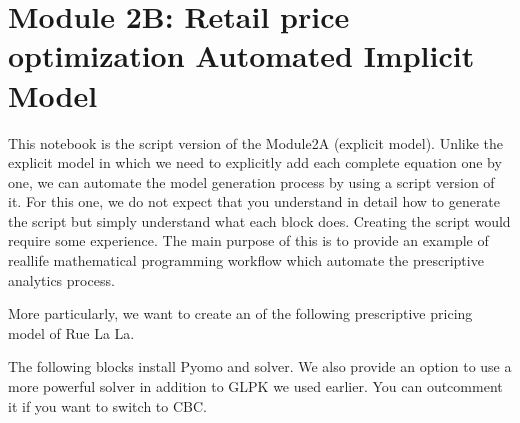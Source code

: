 \documentclass[letterpaper,10pt,english]{jupyterBook}
\begin{document}
\section{Module 2B: Retail price optimization \sphinxhyphen{} Automated Implicit Model}
\label{\detokenize{docs/Case1_5_Module2B_Retail_Price_Optimization_Script:module-2b-retail-price-optimization-automated-implicit-model}}\label{\detokenize{docs/Case1_5_Module2B_Retail_Price_Optimization_Script::doc}}
\sphinxAtStartPar
{}

\sphinxAtStartPar
This notebook is the script version of the Module2A (explicit model). Unlike the explicit model in which we need to explicitly add each complete equation one by one, we can automate the model generation process by using a script version of it. For this one, we do not expect that you understand in detail how to generate the script but simply understand what each block does. Creating the script would require some experience. The main purpose of this is to provide an example of real\sphinxhyphen{}life mathematical programming workflow which automate the prescriptive analytics process.

\sphinxAtStartPar
More particularly, we want to create an  of the following prescriptive pricing model of Rue La La.



\sphinxAtStartPar
The following blocks install Pyomo and solver. We also provide an option to use a more powerful solver  in addition to GLPK we used earlier. You can outcomment it if you want to switch to CBC.

\begin{sphinxVerbatim}[commandchars=\\\{\}]
   
  
\end{sphinxVerbatim}
\end{document}
